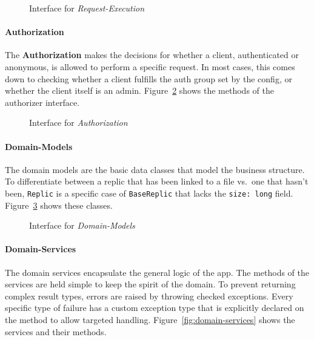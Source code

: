 \begin{figure}
    \centering

    \caption{Interface for \textit{Request-Execution}}
    \label{fig:inter-executors}
\end{figure}

\paragraph{Authorization}
The \textbf{Authorization} makes the decisions for whether a client, authenticated or anonymous, is allowed to perform a specific request. \newline
In most cases, this comes down to checking whether a client fulfills the auth group set by the config, or whether the client itself is an admin.
Figure~\ref{fig:inter-authorizer} shows the methods of the authorizer interface.

\begin{figure}
    \centering

    \caption{Interface for \textit{Authorization}}
    \label{fig:inter-authorizer}
\end{figure}

\paragraph{Domain-Models}
The domain models are the basic data classes that model the business structure. \newline
To differentiate between a replic that has been linked to a file vs.\ one that hasn't been, \texttt{Replic} is a specific case of \texttt{BaseReplic} that lacks the \texttt{size: long} field.
Figure~\ref{fig:domain-models} shows these classes.

\begin{figure}
    \centering

    \caption{Interface for \textit{Domain-Models}}
    \label{fig:domain-models}
\end{figure}

\paragraph{Domain-Services} \label{par:domain-services}
The domain services encapsulate the general logic of the app. \newline
The methods of the services are held simple to keep the spirit of the domain.
To prevent returning complex result types, errors are raised by throwing checked exceptions.
Every specific type of failure has a custom exception type that is explicitly declared on the method to allow targeted handling.
Figure~\ref{fig:domain-services} shows the services and their methods.

